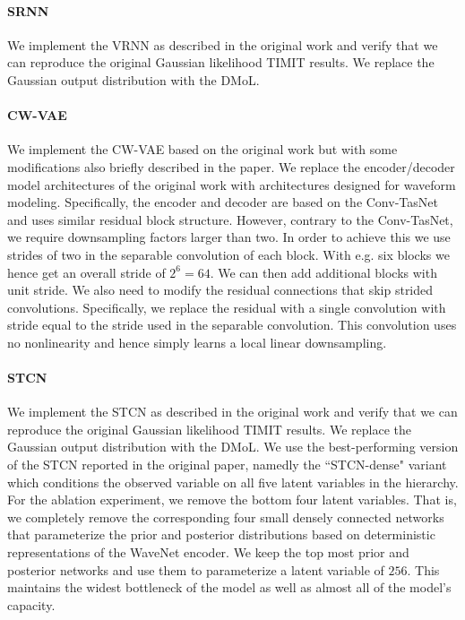 \paragraph{SRNN}
We implement the VRNN as described in the original work \cite{fraccaro_sequential_2016} and verify that we can reproduce the original Gaussian likelihood TIMIT results. We replace the Gaussian output distribution with the DMoL. 

\paragraph{CW-VAE} We implement the CW-VAE based on the original work \cite{saxena_clockwork_2021} but with some modifications also briefly described in the paper. We replace the encoder/decoder model architectures of the original work with architectures designed for waveform modeling. Specifically, the encoder and decoder are based on the Conv-TasNet \cite{luo_conv-tasnet_2019} and uses similar residual block structure. However, contrary to the Conv-TasNet, we require downsampling factors larger than two. In order to achieve this we use strides of two in the separable convolution of each block. With e.g. six blocks we hence get an overall stride of $2^6=64$. We can then add additional blocks with unit stride.
We also need to modify the residual connections that skip strided convolutions. Specifically, we replace the residual with a single convolution with stride equal to the stride used in the separable convolution. This convolution uses no nonlinearity and hence simply learns a local linear downsampling.

\paragraph{STCN} We implement the STCN as described in the original work \cite{aksan_stcn_2019} and verify that we can reproduce the original Gaussian likelihood TIMIT results. We replace the Gaussian output distribution with the DMoL. We use the best-performing version of the STCN reported in the original paper, namedly the ``STCN-dense" variant which conditions the observed variable on all five latent variables in the hierarchy. For the ablation experiment, we remove the bottom four latent variables. That is, we completely remove the corresponding four small densely connected networks that parameterize the prior and posterior distributions based on deterministic representations of the WaveNet encoder. We keep the top most prior and posterior networks and use them to parameterize a latent variable of $256$. This maintains the widest bottleneck of the model as well as almost all of the model's capacity.

